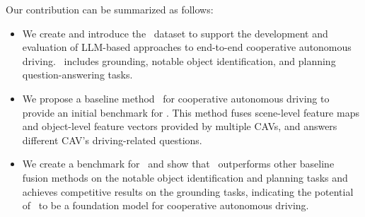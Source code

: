Our contribution can be summarized as follows:
\begin{itemize}
\item  We create and introduce the \namedataset~dataset to support the development and evaluation of LLM-based approaches to end-to-end cooperative autonomous driving.
\namedataset~includes grounding, notable object identification, and planning question-answering tasks.


\item We propose a baseline method \namemethod~for cooperative autonomous driving to provide an initial benchmark for \namedataset. This method fuses scene-level feature maps and object-level feature vectors provided by multiple CAVs, and answers different CAV's driving-related questions. 

\item We create a benchmark for \namedataset~and show that \namemethod~outperforms other baseline fusion methods on the notable object identification and planning tasks and achieves competitive results on the grounding tasks, indicating the potential of \namemethod~to be a foundation model for cooperative autonomous driving.
  
\end{itemize}

 
   